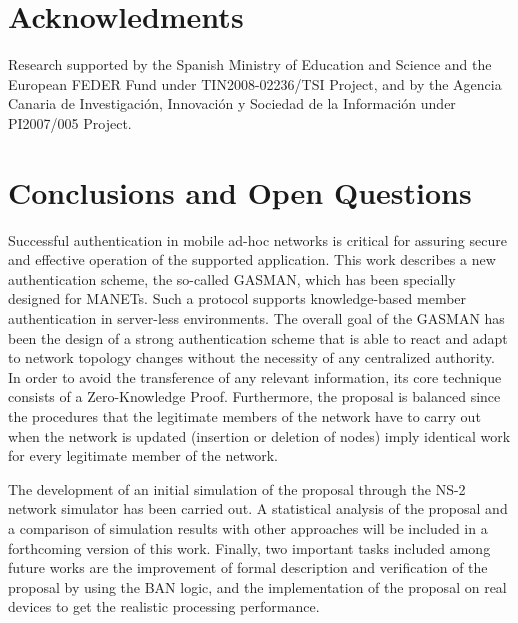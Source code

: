 \documentclass{article}
\begin{document}
\section*{Acknowledments}
Research supported by the Spanish
Ministry of Education and Science and the European FEDER Fund
under TIN2008-02236/TSI Project, and by the Agencia Canaria de Investigaci\'on, Innovaci\'on y Sociedad de la Informaci\'on under PI2007/005 Project.

\section{Conclusions and Open Questions}

Successful authentication in mobile ad-hoc networks is critical for assuring secure and effective operation of the supported application. This work describes a new authentication scheme, the so-called GASMAN, which has been
specially designed for MANETs. Such a protocol supports
knowledge-based member authentication  in server-less
environments. The overall goal of the GASMAN has been the design of
a strong authentication scheme that is able to react and adapt to
network topology changes without the necessity of any centralized
authority. In order to avoid the transference of any relevant information, its core technique consists of a Zero-Knowledge Proof.
Furthermore, the proposal is balanced since the procedures that
the legitimate members of the network have to carry out when the
network is updated (insertion or deletion of nodes) imply
identical work for every legitimate member of the network.

The development of an initial simulation of the proposal through
the NS-2 network simulator has been carried out.  A  statistical analysis of the proposal and a comparison of simulation results with other approaches will be included in a forthcoming version of
this work. Finally, two important tasks  included among future works are the improvement of formal description and verification of the proposal by using the BAN logic, and the implementation of the proposal on real devices to get the realistic processing performance.
\end{document}
